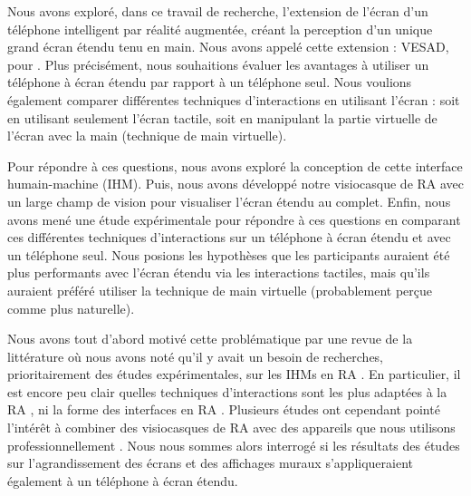 Nous avons exploré, dans ce travail de recherche, l'extension de l'écran d'un téléphone intelligent par réalité augmentée, créant la perception d'un unique grand écran étendu tenu en main. Nous avons appelé cette extension : VESAD, pour . Plus précisément, nous souhaitions évaluer les avantages à utiliser un téléphone à écran étendu par rapport à un téléphone seul. Nous voulions également comparer différentes techniques d'interactions en utilisant l'écran : soit en utilisant seulement l'écran tactile, soit en manipulant la partie virtuelle de l'écran avec la main (technique de main virtuelle).

Pour répondre à ces questions, nous avons exploré la conception de cette interface humain-machine (IHM). Puis, nous avons développé notre visiocasque de RA avec un large champ de vision pour visualiser l'écran étendu au complet. Enfin, nous avons mené une étude expérimentale pour répondre à ces questions en comparant ces différentes techniques d'interactions sur un téléphone à écran étendu et avec un téléphone seul. Nous posions les hypothèses que les participants auraient été plus performants avec l'écran étendu via les interactions tactiles, mais qu'ils auraient préféré utiliser la technique de main virtuelle (probablement perçue comme plus naturelle).

Nous avons tout d'abord motivé cette problématique par une revue de la littérature  où nous avons noté qu'il y avait un besoin de recherches, prioritairement des études expérimentales, sur les IHMs en RA \citep{Billinghurst2005, Billinghurst2015}. En particulier, il est encore peu clair quelles techniques d'interactions sont les plus adaptées à la RA \citep{Argelaguet2013, Piumsomboon2013, Piumsomboon2014}, ni la forme des interfaces en RA \citep{VanDam1997, Ens2014a, Serrano2015}. Plusieurs études ont cependant pointé l'intérêt à combiner des visiocasques de RA avec des appareils que nous utilisons professionnellement \citep{Grubert2015, Serrano2015a}. Nous nous sommes alors interrogé si les résultats des études sur l'agrandissement des écrans \cite{Baudisch2002, Guiard2004} et des affichages muraux \cite{Liu2014, Raedle2014} s'appliqueraient également à un téléphone à écran étendu.

